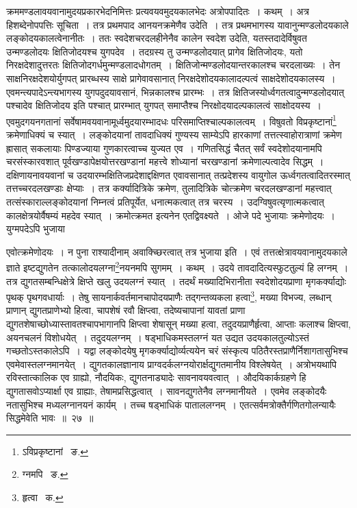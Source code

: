 \documentclass[11pt, openany]{book}
\begin{document}
\newpage
\begin{sloppypar} 
\noindent क्रममण्डलावयवानामुदयप्रकारभेदनिमित्तः प्रत्यवयवमुदयकालभेदः अत्रोपपादितः~। कथम्~। अत्र हिशब्देनोपपत्तिः सूचिता~। तत्र 
प्रथमपाद आनयनक्रमेणैव उदेति~। तत्र प्रथमभागस्य यावानुन्मण्डलोदयकाले लङ्कोदयकालत्वेनानीतः~। ततः स्वदेशचरदलहीनेनैव कालेन स्वदेश 
उदेति, यतस्तदादेर्विषुवत उन्मण्डलोदयः क्षितिजोदयश्च युगपदेव~। तदग्रस्य तु उन्मण्डलोदयात् प्रागेव क्षितिजोदयः, यतो निरक्षदेशादुत्तरतः
क्षितिजोदगर्धमुन्मण्डलादधोगतम्~। क्षितिजोन्मण्डलोदयान्तरकालश्च चरदलाख्यः~। तेन साक्षनिरक्षदेशयोर्युगपत् प्रारब्धस्य साक्षे प्रागेवावसानात् 
निरक्षदेशोदयकालादल्पत्वं साक्षदेशोदयकालस्य~। एवमन्त्यपादेऽन्त्यभागस्य युगपदुदयावसानं, भिन्नकालश्च प्रारम्भः~। तत्र क्षितिजस्योर्ध्वगतत्वादुन्मण्डलोदयात् पश्चादेव क्षितिजोदय इति पश्चात् प्रारम्भात् युगपत् समाप्तैश्च निरक्षोदयादल्पकालत्वं साक्षोदयस्य~। एवमुदगयनगतानां सर्वेषामवयवानामूर्ध्वमुदयारम्भादधः परिसमाप्तिश्चाल्पकालत्वम्~। विषुवतो विप्रकृष्टानां\renewcommand{\thefootnote}{१}\footnote{ऽविप्रकृष्टानां \textendash\ ङ.} क्रमेणाधिक्यं च स्यात्~। लङ्कोदयानां तावदाधिक्यं गुण्यस्य साम्येऽपि हारकाणां तत्तत्स्वाहोरात्राणां क्रमेण ह्रासात् सकलायाः पिण्डज्याया गुणकारत्वाच्च युज्यत एव~। गणितसिद्धं चैतत् सर्वं स्वदेशोदयानामपि चरसंस्कारवशात् पूर्वखण्डापेक्षयोत्तरखण्डानां महत्त्वे शोध्यानां चरखण्डानां क्रमेणाल्पत्वादेव सिद्धम्~। दक्षिणायनावयवानां च उदयारम्भक्षितिजप्रदेशाद्दक्षिणत एवावसानात् तत्प्रदेशस्य वायुगोल ऊर्ध्वगतत्वादितरस्मात् तत्तच्चरदलखण्डाः क्षेप्याः~। तत्र कर्क्यादित्रिके क्रमेण, तुलादित्रिके चोत्क्रमेण चरदलखण्डानां महत्त्वात् तत्संस्काराल्लङ्कोदयानां निम्नत्वं प्रतिपूर्येत, धनात्मकत्वात् तत्र चरस्य~। उदग्विषुवत्यृणात्मकत्वात् कालक्षेत्रयोर्वैषम्यं महदेव स्यात्~। {\qt क्रमोत्क्रमत} इत्यनेन एतद्विवक्ष्यते~। ओजे पदे भुजायाः क्रमेणोदयः~। युग्मपदेऽपि भुजाया 
\end{sloppypar} 
\newpage

\noindent एवोत्क्रमेणोदयः~। न पुना राश्यादीनाम् अवाक्च्छिरत्वात् तत्र भुजाया इति~। एवं तत्तत्क्षेत्रावयवानामुदयकाले ज्ञाते इष्टद्युगतेन
तत्कालोदयलग्ना\renewcommand{\thefootnote}{१}\footnote{ग्नमपि \textendash\ ङ.}नयनमपि सुगमम्~। कथम्~। उदये तावदादित्यस्फुटतुल्यं हि लग्नम्~। तत्र द्युगतसम्बन्धिक्षेत्रे क्षिप्ते खलु उदयलग्नं स्यात्~। तदर्थं मख्यादिभिरानीता स्वदेशोदयप्राणा मृगकर्क्याद्योः पृथक् पृथगवधार्याः~। तेषु सायनार्कवर्तमानचापोदयप्राणैः तद्गन्तव्यकला हत्वा\renewcommand{\thefootnote}{२}\footnote{हृत्वा \textendash\ क.}, मख्या विभज्य, लब्धान् प्राणान् द्युगतप्राणेभ्यो हित्वा, चापशेषं रवौ क्षिप्त्वा, तदेष्यचापानां यावतां प्राणा द्युगतशेषाच्छोध्यास्तावतश्चापभागानपि क्षिप्त्वा शेषासून् मख्या हत्वा, तदुदयप्राणैर्हृत्वा, आप्ताः कलाश्च क्षिप्त्वा, अयनचलनं विशोधयेत्~। तदुदयलग्नम्~। षड्भाधिकमस्तलग्नं यत उद्यत उदयकालतुल्योऽस्तं गच्छतोऽस्तकालेऽपि~। यद्वा लङ्कोदयेषु मृगकर्क्याद्योर्व्यत्ययेन चरं संस्कृत्य पठितैरस्तप्राणैर्निशागतासुभिश्च एवमेवास्तलग्नमानयेत्~। द्युगतकालज्ञानाय प्राग्वदर्कलग्नयोरार्क्षद्युगतमानीय विश्लेषयेत्~। अत्रोभयथापि रविस्तात्कालिक एव ग्राह्यो, नौदयिकः, द्युगतनाड्यादेः सावनावयवत्वात्~। औदयिकार्कग्रहणे हि द्युगतासवोऽप्यार्क्षा एव ग्राह्याः, तेषामप्रसिद्धत्वात्~। सावनद्युगतेनैव लग्नमानीयते~। एवमेव लङ्कोदयैः नतासुभिश्च मध्यलग्नानयनं कार्यम्~। तच्च षड्भाधिकं पाताललग्नम्~। एतत्सर्वमत्रोक्तैर्गणितगोलन्यायैः सिद्धमेवेति भावः~॥~२७~॥ \\
\end{document}
